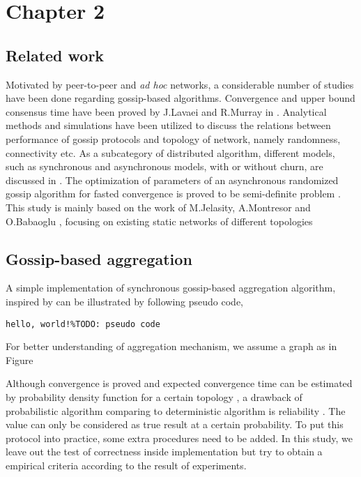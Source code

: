 \documentclass[11pt,a4paper]{article}
\begin{document}
\newpage

\section{Chapter 2}
\subsection{Related work}
Motivated by peer-to-peer and {\it ad hoc} networks, a considerable number of studies have been done regarding gossip-based algorithms. Convergence and upper bound consensus time have been proved by J.Lavaei and R.Murray in \cite{5929538}. Analytical methods and simulations have been utilized to discuss the relations between performance of gossip protocols and topology of network, namely randomness, connectivity etc. As a subcategory of distributed algorithm, different models, such as synchronous and asynchronous models, with or without churn, are discussed in \cite{Lynch:1996:DA:525656}. The optimization of parameters of an asynchronous randomized gossip algorithm for fasted convergence is proved to be semi-definite problem \cite{1429652}.\\
This study is mainly based on the work of M.Jelasity, A.Montresor and O.Babaoglu \cite{jelasity_gossip-based_2005}, focusing on existing static networks of different topologies \cite{knight_internet_2011}

\subsection{Gossip-based aggregation}
A simple implementation of synchronous gossip-based aggregation algorithm, inspired by \cite{jelasity_gossip-based_2005} can be illustrated by following pseudo code,
\begin{verbatim}
hello, world!%TODO: pseudo code
\end{verbatim}
For better understanding of aggregation mechanism, we assume a graph as in Figure

Although convergence is proved and expected convergence time can be estimated by probability density function for a certain topology \cite{5929538}, a drawback of probabilistic algorithm comparing to deterministic algorithm is reliability \cite{Lynch:1996:DA:525656}. The value can only be considered as true result at a certain probability. To put this protocol into practice, some extra procedures need to be added. In this study, we leave out the test of correctness inside implementation but try to obtain a empirical criteria according to the result of experiments.\\
\end{document}
